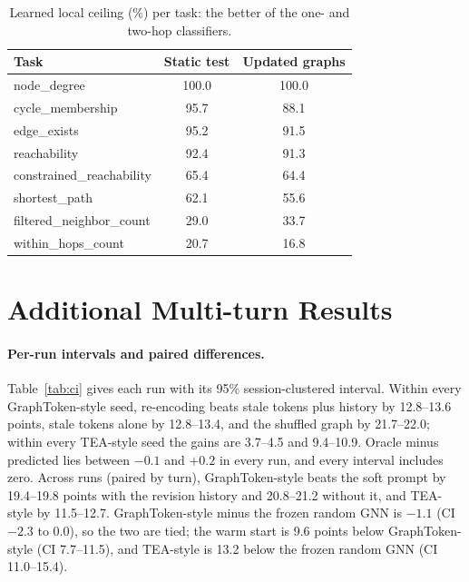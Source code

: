 \documentclass[11pt]{article}
\begin{document}
\begin{table}[t]
\centering
\small
\begin{tabular}{@{}lcc@{}}
\toprule
\textbf{Task} & \textbf{Static test} & \textbf{Updated graphs} \\
\midrule
node\_degree & 100.0 & 100.0 \\
cycle\_membership & 95.7 & 88.1 \\
edge\_exists & 95.2 & 91.5 \\
reachability & 92.4 & 91.3 \\
constrained\_reachability & 65.4 & 64.4 \\
shortest\_path & 62.1 & 55.6 \\
filtered\_neighbor\_count & 29.0 & 33.7 \\
within\_hops\_count & 20.7 & 16.8 \\
\bottomrule
\end{tabular}
\caption{Learned local ceiling (\%) per task: the better of the one- and two-hop classifiers.}
\label{tab:ceilings}
\end{table}

\section{Additional Multi-turn Results}
\label{app:more-results}

\paragraph{Per-run intervals and paired differences.}
Table~\ref{tab:ci} gives each run with its 95\% session-clustered interval.
Within every GraphToken-style seed, re-encoding beats stale tokens plus history by 12.8--13.6 points, stale tokens alone by 12.8--13.4, and the shuffled graph by 21.7--22.0; within every TEA-style seed the gains are 3.7--4.5 and 9.4--10.9.
Oracle minus predicted lies between $-0.1$ and $+0.2$ in every run, and every interval includes zero.
Across runs (paired by turn), GraphToken-style beats the soft prompt by 19.4--19.8 points with the revision history and 20.8--21.2 without it, and TEA-style by 11.5--12.7.
GraphToken-style minus the frozen random GNN is $-1.1$ (CI $-2.3$ to 0.0), so the two are tied; the warm start is 9.6 points below GraphToken-style (CI 7.7--11.5), and TEA-style is 13.2 below the frozen random GNN (CI 11.0--15.4).
\end{document}
